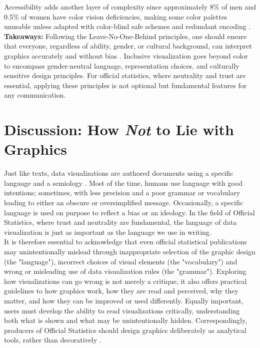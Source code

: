 \documentclass[11pt,twoside,a4paper]{article}
\begin{document}
 Accessibility adds another layer of complexity since approximately 8\% of men and 0.5\% of women have color vision deficiencies, making some color palettes unusable unless adapted with color-blind safe schemes and redundant encoding \citep{muth2018color}.\\  
 
 \noindent \textbf{ Takeaways:}  Following the Leave-No-One-Behind principles, one should ensure that everyone, regardless of ability, gender, or cultural background, can interpret graphics accurately and without bias \citep{Schwabish2022}. Inclusive visualization  goes beyond color to encompass gender-neutral language, representation choices, and culturally sensitive design principles. For official statistics, where neutrality and trust are essential, applying these principles is not optional but  fundamental features for any communication.

\section{ Discussion: How \textit{Not} to Lie with Graphics}

Just like  texts,  data visualizations are authored documents using a specific language and a semiology \citep{Bertin1983English}. Most of the time, humans use language with good intentions; sometimes, with less precision and a poor grammar or vocabulary leading to either an obscure or oversimplified message. Occasionally, a specific language is used on purpose to reflect a bias or an ideology. In the field of Official Statistics, where trust and neutrality are fundamental, the language of data visualization is just as important as the language we use in writing.\\

It is therefore essential to acknowledge that even official statistical publications may unintentionally mislead through inappropriate selection of the graphic design (the "language"), incorrect choices of visual elements (the "vocabulary")  and  wrong or misleading use of data visualization rules (the "grammar"). Exploring how visualizations can go wrong is not merely a critique, it also offers practical guidelines to how graphics work, how they are read and perceived, why they matter, and how they can be improved or used differently.
Equally important, users must develop the ability to read visualizations critically, understanding both what is shown and what may be unintentionally hidden. Correspondingly, producers of Official Statistics should design graphics deliberately as analytical tools, rather than decoratively \citep{Tufte2006}.\\
\end{document}
